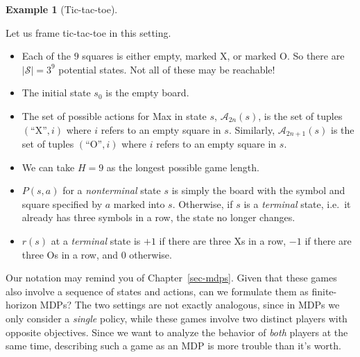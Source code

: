 \documentclass[
  letterpaper,
  DIV=11,
  numbers=noendperiod]{scrreprt}
\providecommand{\tightlist}{%
  \setlength{\itemsep}{0pt}\setlength{\parskip}{0pt}}\usepackage{longtable,booktabs,array}
\theoremstyle{plain}
\theoremstyle{plain}
\theoremstyle{definition}
\newtheorem{example}{Example}[chapter]
\theoremstyle{definition}
\theoremstyle{remark}
\begin{document}
\begin{example}[Tic-tac-toe]\protect\hypertarget{exm-tic-tac-toe}{}\label{exm-tic-tac-toe}

Let us frame tic-tac-toe in this setting.

\begin{itemize}
\tightlist
\item
  Each of the \(9\) squares is either empty, marked X, or marked O. So
  there are \(|\mathcal{S}| = 3^9\) potential states. Not all of these
  may be reachable!
\item
  The initial state \(s_0\) is the empty board.
\item
  The set of possible actions for Max in state \(s\),
  \(\mathcal{A}_{2n}(s)\), is the set of tuples \((\text{``X''}, i)\)
  where \(i\) refers to an empty square in \(s\). Similarly,
  \(\mathcal{A}_{2n+1}(s)\) is the set of tuples \((\text{``O''}, i)\)
  where \(i\) refers to an empty square in \(s\).
\item
  We can take \(H = 9\) as the longest possible game length.
\item
  \(P(s, a)\) for a \emph{nonterminal} state \(s\) is simply the board
  with the symbol and square specified by \(a\) marked into \(s\).
  Otherwise, if \(s\) is a \emph{terminal} state, i.e.~it already has
  three symbols in a row, the state no longer changes.
\item
  \(r(s)\) at a \emph{terminal} state is \(+1\) if there are three Xs in
  a row, \(-1\) if there are three Os in a row, and \(0\) otherwise.
\end{itemize}

\end{example}

Our notation may remind you of Chapter~\ref{sec-mdps}. Given that these
games also involve a sequence of states and actions, can we formulate
them as finite-horizon MDPs? The two settings are not exactly analogous,
since in MDPs we only consider a \emph{single} policy, while these games
involve two distinct players with opposite objectives. Since we want to
analyze the behavior of \emph{both} players at the same time, describing
such a game as an MDP is more trouble than it's worth.
\end{document}
